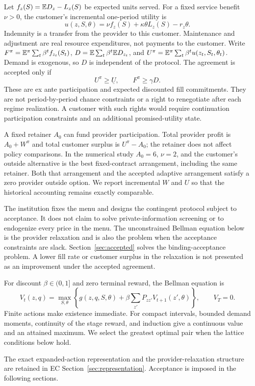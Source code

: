 Let $f_z(S)=\mathbb E D_z-L_z(S)$ be expected units served. For a fixed service benefit $\nu>0$, the customer's incremental one-period utility is
\begin{equation}\label{eq:customer}
 u(z,S,\theta)=\nu f_z(S)+\kappa\theta L_z(S)-r_z\theta.
\end{equation}
Indemnity is a transfer from the provider to this customer. Maintenance and adjustment are real resource expenditures, not payments to the customer. Write $F^\pi=\mathbb E^\pi\sum_t\beta^t f_{z_t}(S_t)$, $D=\mathbb E\sum_t\beta^t\mathbb E D_{z_t}$, and $U^\pi=\mathbb E^\pi\sum_t\beta^t u(z_t,S_t,\theta_t)$. Demand is exogenous, so $D$ is independent of the protocol. The agreement is accepted only if
\begin{equation}\label{eq:participation}
 U^\pi\geq\underline U,\qquad F^\pi\geq\gamma D.
\end{equation}
These are ex ante participation and expected discounted fill commitments. They are not period-by-period chance constraints or a right to renegotiate after each regime realization. A customer with such rights would require continuation participation constraints and an additional promised-utility state.

A fixed retainer $A_0$ can fund provider participation. Total provider profit is $A_0+W^\pi$ and total customer surplus is $U^\pi-A_0$; the retainer does not affect policy comparisons. In the numerical study $A_0=6$, $\nu=2$, and the customer's outside alternative is the best fixed-contract arrangement, including the same retainer. Both that arrangement and the accepted adaptive arrangement satisfy a zero provider outside option. We report incremental $W$ and $U$ so that the historical accounting remains exactly comparable.

The institution fixes the menu and designs the contingent protocol subject to acceptance. It does not claim to solve private-information screening or to endogenize every price in the menu. The unconstrained Bellman equation below is the provider relaxation and is also the problem when the acceptance constraints are slack. Section~\ref{sec:accepted} solves the binding-acceptance problem. A lower fill rate or customer surplus in the relaxation is not presented as an improvement under the accepted agreement.

For discount $\beta\in(0,1]$ and zero terminal reward, the Bellman equation is
\begin{equation}\label{eq:bellman}
 V_t(z,q)=\max_{S,\theta}\left\{g(z,q,S,\theta)
       +\beta\sum_{z'}P_{zz'}V_{t+1}(z',\theta)\right\},\qquad V_T=0.
\end{equation}
Finite actions make existence immediate. For compact intervals, bounded demand moments, continuity of the stage reward, and induction give a continuous value and an attained maximum. We select the greatest optimal pair when the lattice conditions below hold.


The exact expanded-action representation and the provider-relaxation structure are retained in EC Section~\ref{sec:representation}. Acceptance is imposed in the following sections.

